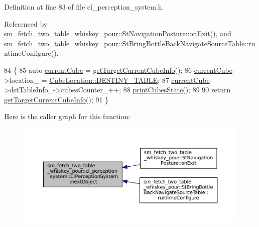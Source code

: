 Definition at line 83 of file cl\+\_\+perception\+\_\+system.\+h.



Referenced by sm\+\_\+fetch\+\_\+two\+\_\+table\+\_\+whiskey\+\_\+pour\+::\+St\+Navigation\+Posture\+::on\+Exit(), and sm\+\_\+fetch\+\_\+two\+\_\+table\+\_\+whiskey\+\_\+pour\+::\+St\+Bring\+Bottle\+Back\+Navigate\+Source\+Table\+::runtime\+Configure().


\begin{DoxyCode}
84             \{
85                 \textcolor{keyword}{auto} \hyperlink{classsm__fetch__two__table__whiskey__pour_1_1cl__perception__system_1_1ClPerceptionSystem_ae587d77404f6518bb1f6cf8e835aa3e9}{currentCube} = \hyperlink{classsm__fetch__two__table__whiskey__pour_1_1cl__perception__system_1_1ClPerceptionSystem_a09899882cdea9c265e98881bb903882b}{getTargetCurrentCubeInfo}();
86                 \hyperlink{classsm__fetch__two__table__whiskey__pour_1_1cl__perception__system_1_1ClPerceptionSystem_ae587d77404f6518bb1f6cf8e835aa3e9}{currentCube}->location\_ = \hyperlink{namespacesm__fetch__two__table__whiskey__pour_1_1cl__perception__system_a7523acd4abcc84c78d6a15965f9c25b9acdc3fdda18904b4a1ac0be036c86f973}{CubeLocation::DESTINY\_TABLE};
87                 \hyperlink{classsm__fetch__two__table__whiskey__pour_1_1cl__perception__system_1_1ClPerceptionSystem_ae587d77404f6518bb1f6cf8e835aa3e9}{currentCube}->dstTableInfo\_->cubesCounter\_++;
88                 \hyperlink{classsm__fetch__two__table__whiskey__pour_1_1cl__perception__system_1_1ClPerceptionSystem_a82afda9f4a97f212313b5912206e03a4}{printCubesState}();
89 
90                 \textcolor{keywordflow}{return} \hyperlink{classsm__fetch__two__table__whiskey__pour_1_1cl__perception__system_1_1ClPerceptionSystem_a09899882cdea9c265e98881bb903882b}{getTargetCurrentCubeInfo}();
91             \}
\end{DoxyCode}
Here is the caller graph for this function\+:
\nopagebreak
\begin{figure}[H]
\begin{center}
\leavevmode
\includegraphics[width=350pt]{classsm__fetch__two__table__whiskey__pour_1_1cl__perception__system_1_1ClPerceptionSystem_af64db2ac7aafc3369f84c02b2a360b28_icgraph}
\end{center}
\end{figure}
